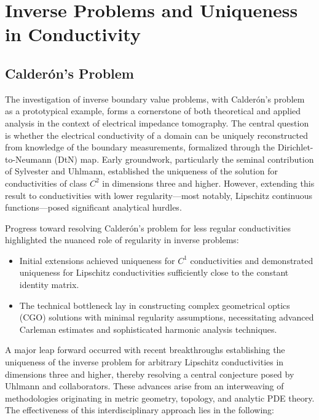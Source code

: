 \section{Inverse Problems and Uniqueness in Conductivity}

\subsection{Calderón's Problem}

The investigation of inverse boundary value problems, with Calderón's problem as a prototypical example, forms a cornerstone of both theoretical and applied analysis in the context of electrical impedance tomography. The central question is whether the electrical conductivity of a domain can be uniquely reconstructed from knowledge of the boundary measurements, formalized through the Dirichlet-to-Neumann (DtN) map. Early groundwork, particularly the seminal contribution of Sylvester and Uhlmann, established the uniqueness of the solution for conductivities of class $C^2$ in dimensions three and higher. However, extending this result to conductivities with lower regularity---most notably, Lipschitz continuous functions---posed significant analytical hurdles.

Progress toward resolving Calderón's problem for less regular conductivities highlighted the nuanced role of regularity in inverse problems:

\begin{itemize}
    \item Initial extensions achieved uniqueness for $C^1$ conductivities and demonstrated uniqueness for Lipschitz conductivities sufficiently close to the constant identity matrix.
    \item The technical bottleneck lay in constructing complex geometrical optics (CGO) solutions with minimal regularity assumptions, necessitating advanced Carleman estimates and sophisticated harmonic analysis techniques.
\end{itemize}

A major leap forward occurred with recent breakthroughs establishing the uniqueness of the inverse problem for arbitrary Lipschitz conductivities in dimensions three and higher, thereby resolving a central conjecture posed by Uhlmann and collaborators. These advances arise from an interweaving of methodologies originating in metric geometry, topology, and analytic PDE theory. The effectiveness of this interdisciplinary approach lies in the following:

